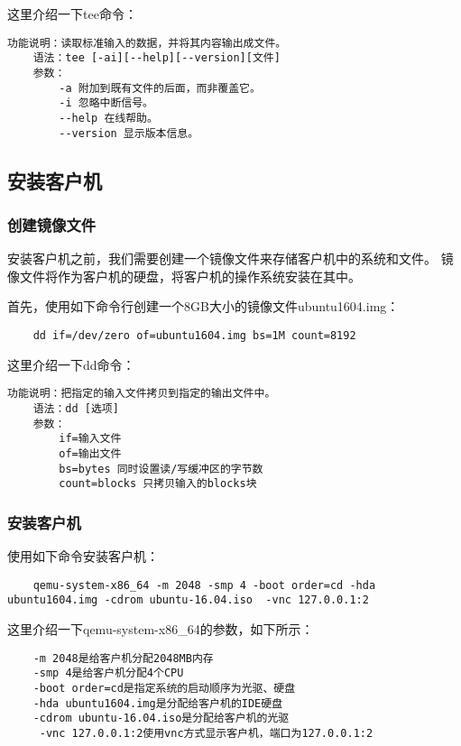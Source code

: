 \documentclass[a4paper,left=2.5cm,right=2.5cm,11pt]{article}
\begin{document}
	这里介绍一下tee命令：
	\begin{lstlisting}[numberstyle = \color{white}]
	功能说明：读取标准输入的数据，并将其内容输出成文件。
	语法：tee [-ai][--help][--version][文件]
	参数：
		-a 附加到既有文件的后面，而非覆盖它。
		-i 忽略中断信号。
		--help 在线帮助。
		--version 显示版本信息。
	\end{lstlisting}

\subsection{安装客户机}
\subsubsection{创建镜像文件}
	安装客户机之前，我们需要创建一个镜像文件来存储客户机中的系统和文件。
	镜像文件将作为客户机的硬盘，将客户机的操作系统安装在其中。\par
	
	首先，使用如下命令行创建一个8GB大小的镜像文件ubuntu1604.img：
	\begin{lstlisting}
	dd if=/dev/zero of=ubuntu1604.img bs=1M count=8192
	\end{lstlisting}

	这里介绍一下dd命令：
	\begin{lstlisting}[numberstyle = \color{white}]
	功能说明：把指定的输入文件拷贝到指定的输出文件中。
	语法：dd [选项]
	参数：
		if=输入文件
		of=输出文件
		bs=bytes 同时设置读/写缓冲区的字节数
		count=blocks 只拷贝输入的blocks块
	\end{lstlisting}

\subsubsection{安装客户机}
	使用如下命令安装客户机：
	\begin{lstlisting}
	qemu-system-x86_64 -m 2048 -smp 4 -boot order=cd -hda ubuntu1604.img -cdrom ubuntu-16.04.iso  -vnc 127.0.0.1:2
	\end{lstlisting}

	这里介绍一下qemu-system-x86\_64的参数，如下所示：
	\begin{lstlisting}
	-m 2048是给客户机分配2048MB内存
	-smp 4是给客户机分配4个CPU
	-boot order=cd是指定系统的启动顺序为光驱、硬盘
	-hda ubuntu1604.img是分配给客户机的IDE硬盘
	-cdrom ubuntu-16.04.iso是分配给客户机的光驱
	 -vnc 127.0.0.1:2使用vnc方式显示客户机，端口为127.0.0.1:2
	\end{lstlisting}
\end{document}
